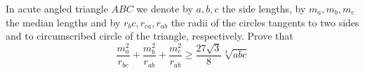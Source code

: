 In acute angled triangle $ABC$ we denote by $a,b,c$ the side lengths, by $m_a,m_b,m_c$ the median lengths and by $r_{b}c,r_{ca},r_{ab}$ the radii of the circles tangents to two sides and to circumscribed circle of the triangle, respectively. Prove that
$$\frac{m_a^2}{r_{bc}}+\frac{m_b^2}{r_{ab}}+\frac{m_c^2}{r_{ab}} \ge \frac{27\sqrt3}{8}\sqrt[3]{abc}$$